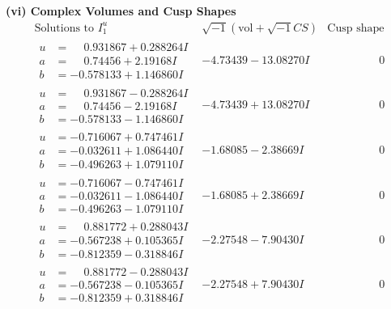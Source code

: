 \documentclass[1p]{elsarticle_modified}
\theoremstyle{definition}
\newcommand{\I}{\sqrt{-1}}
\begin{document}
\newpage\flushleft \textbf{(vi) Complex Volumes and Cusp Shapes}
$$\begin{array}{c|c|c}  
\text{Solutions to }I^u_{1}& \I (\text{vol} + \sqrt{-1}CS) & \text{Cusp shape}\\
 \hline 
\begin{aligned}
u &= \phantom{-}0.931867 + 0.288264 I \\
a &= \phantom{-}0.74456 + 2.19168 I \\
b &= -0.578133 + 1.146860 I\end{aligned}
 & -4.73439 - 13.08270 I & \phantom{-0.000000 } 0 \\ \hline\begin{aligned}
u &= \phantom{-}0.931867 - 0.288264 I \\
a &= \phantom{-}0.74456 - 2.19168 I \\
b &= -0.578133 - 1.146860 I\end{aligned}
 & -4.73439 + 13.08270 I & \phantom{-0.000000 } 0 \\ \hline\begin{aligned}
u &= -0.716067 + 0.747461 I \\
a &= -0.032611 + 1.086440 I \\
b &= -0.496263 + 1.079110 I\end{aligned}
 & -1.68085 - 2.38669 I & \phantom{-0.000000 } 0 \\ \hline\begin{aligned}
u &= -0.716067 - 0.747461 I \\
a &= -0.032611 - 1.086440 I \\
b &= -0.496263 - 1.079110 I\end{aligned}
 & -1.68085 + 2.38669 I & \phantom{-0.000000 } 0 \\ \hline\begin{aligned}
u &= \phantom{-}0.881772 + 0.288043 I \\
a &= -0.567238 + 0.105365 I \\
b &= -0.812359 - 0.318846 I\end{aligned}
 & -2.27548 - 7.90430 I & \phantom{-0.000000 } 0 \\ \hline\begin{aligned}
u &= \phantom{-}0.881772 - 0.288043 I \\
a &= -0.567238 - 0.105365 I \\
b &= -0.812359 + 0.318846 I\end{aligned}
 & -2.27548 + 7.90430 I & \phantom{-0.000000 } 0 \\ \hline\begin{aligned}

\end{aligned}
\end{array}$$
\end{document}
